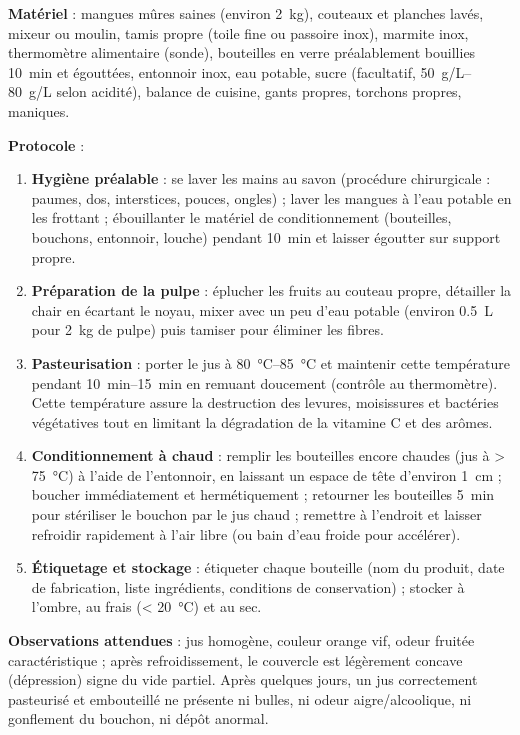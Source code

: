\documentclass[11pt]{article}
\begin{document}
\begin{experience}
\textbf{Matériel} : mangues mûres saines (environ \SI{2}{kg}), couteaux et planches lavés, mixeur ou moulin, tamis propre (toile fine ou passoire inox), marmite inox, thermomètre alimentaire (sonde), bouteilles en verre préalablement bouillies \SI{10}{min} et égouttées, entonnoir inox, eau potable, sucre (facultatif, \SIrange{50}{80}{g/L} selon acidité), balance de cuisine, gants propres, torchons propres, maniques.

\textbf{Protocole} :
\begin{enumerate}
\item \textbf{Hygiène préalable} : se laver les mains au savon (procédure chirurgicale : paumes, dos, interstices, pouces, ongles) ; laver les mangues à l'eau potable en les frottant ; ébouillanter le matériel de conditionnement (bouteilles, bouchons, entonnoir, louche) pendant \SI{10}{min} et laisser égoutter sur support propre.
\item \textbf{Préparation de la pulpe} : éplucher les fruits au couteau propre, détailler la chair en écartant le noyau, mixer avec un peu d'eau potable (environ \SI{0,5}{L} pour \SI{2}{kg} de pulpe) puis tamiser pour éliminer les fibres.
\item \textbf{Pasteurisation} : porter le jus à \SIrange{80}{85}{\celsius} et maintenir cette température pendant \SIrange{10}{15}{min} en remuant doucement (contrôle au thermomètre). Cette température assure la destruction des levures, moisissures et bactéries végétatives tout en limitant la dégradation de la vitamine C et des arômes.
\item \textbf{Conditionnement à chaud} : remplir les bouteilles encore chaudes (jus à \textgreater{} \SI{75}{\celsius}) à l'aide de l'entonnoir, en laissant un espace de tête d'environ \SI{1}{cm} ; boucher immédiatement et hermétiquement ; retourner les bouteilles \SI{5}{min} pour stériliser le bouchon par le jus chaud ; remettre à l'endroit et laisser refroidir rapidement à l'air libre (ou bain d'eau froide pour accélérer).
\item \textbf{Étiquetage et stockage} : étiqueter chaque bouteille (nom du produit, date de fabrication, liste ingrédients, conditions de conservation) ; stocker à l'ombre, au frais (\textless{} \SI{20}{\celsius}) et au sec.
\end{enumerate}

\textbf{Observations attendues} : jus homogène, couleur orange vif, odeur fruitée caractéristique ; après refroidissement, le couvercle est légèrement concave (dépression) signe du vide partiel. Après quelques jours, un jus correctement pasteurisé et embouteillé ne présente ni bulles, ni odeur aigre/alcoolique, ni gonflement du bouchon, ni dépôt anormal.


\end{experience}
\end{document}

